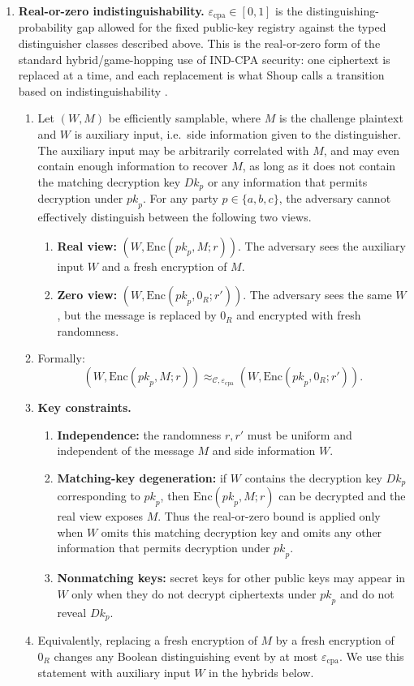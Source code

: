 \documentclass[11pt]{article}
\newcommand{\epscpa}{\varepsilon_{\mathrm{cpa}}}
\newcommand{\C}{\mathcal{C}}
\newcommand{\Encf}{\mathrm{Enc}}
\newcommand{\Dk}{\mathit{Dk}}
\newcommand{\pk}{\mathit{pk}}
\begin{document}
\begin{enumerate}
\item \textbf{Real-or-zero indistinguishability.} $\epscpa \in [0, 1]$ is the distinguishing-probability gap allowed for the fixed public-key registry against the typed distinguisher classes described above. This is the real-or-zero form of the standard hybrid/game-hopping use of IND-CPA security: one ciphertext is replaced at a time, and each replacement is what Shoup calls a transition based on indistinguishability \cite[Sec.~1.1]{shoup-games}.
  \begin{enumerate}[label=8.\arabic*.]
  \item Let $(W,M)$ be efficiently samplable, where $M$ is the challenge plaintext and $W$ is auxiliary input, i.e.\ side information given to the distinguisher. The auxiliary input may be arbitrarily correlated with $M$, and may even contain enough information to recover $M$, as long as it does not contain the matching decryption key $\Dk_p$ or any information that permits decryption under $\pk_p$. For any party $p \in \{a, b, c\}$, the adversary cannot effectively distinguish between the following two views.
    \begin{enumerate}[label=8.1.\arabic*.]
    \item \textbf{Real view:} $(W, \Encf(\pk_p, M; r))$. The adversary sees the auxiliary input $W$ and a fresh encryption of $M$.
    \item \textbf{Zero view:} $(W, \Encf(\pk_p, 0_R; r'))$. The adversary sees the same $W$, but the message is replaced by $0_R$ and encrypted with fresh randomness.
    \end{enumerate}
  \item Formally:
    \[ (W, \Encf(\pk_p, M; r)) \approx_{\C, \epscpa} (W, \Encf(\pk_p, 0_R; r')). \]
  \item \textbf{Key constraints.}
    \begin{enumerate}[label=8.3.\arabic*.]
    \item \textbf{Independence:} the randomness $r, r'$ must be uniform and independent of the message $M$ and side information $W$.
    \item \textbf{Matching-key degeneration:} if $W$ contains the decryption key $\Dk_p$ corresponding to $\pk_p$, then $\Encf(\pk_p, M; r)$ can be decrypted and the real view exposes $M$. Thus the real-or-zero bound is applied only when $W$ omits this matching decryption key and omits any other information that permits decryption under $\pk_p$.
    \item \textbf{Nonmatching keys:} secret keys for other public keys may appear in $W$ only when they do not decrypt ciphertexts under $\pk_p$ and do not reveal $\Dk_p$.
    \end{enumerate}
  \item Equivalently, replacing a fresh encryption of $M$ by a fresh encryption of $0_R$ changes any Boolean distinguishing event by at most $\epscpa$. We use this statement with auxiliary input $W$ in the hybrids below.
  \end{enumerate}


\end{enumerate}
\end{document}
